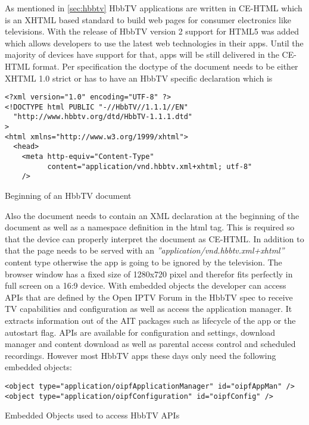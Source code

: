 As mentioned in \ref{sec:hbbtv} HbbTV applications are written in CE-HTML which is an XHTML based standard to build web pages for consumer electronics like televisions. With the release of HbbTV version 2 support for HTML5 was added which allows developers to use the latest web technologies in their apps. Until the majority of devices have support for that, apps will be still delivered in the CE-HTML format. Per specification the doctype of the document needs to be either XHTML 1.0 strict or has to have an HbbTV specific declaration which is

\vspace{1cm}
\begin{listing}[H]
\begin{verbatim}
<?xml version="1.0" encoding="UTF-8" ?>
<!DOCTYPE html PUBLIC "-//HbbTV//1.1.1//EN"
  "http://www.hbbtv.org/dtd/HbbTV-1.1.1.dtd"
>
<html xmlns="http://www.w3.org/1999/xhtml">
  <head>
    <meta http-equiv="Content-Type"
          content="application/vnd.hbbtv.xml+xhtml; utf-8"
    />
\end{verbatim}
\caption{Beginning of an HbbTV document}
\label{lst:doctype}
\end{listing}
\vspace{0.5cm}

Also the document needs to contain an XML declaration at the beginning of the document as well as a namespace definition in the html tag. This is required so that the device can properly interpret the document as CE-HTML. In addition to that the page needs to be served with an \textit{''application/vnd.hbbtv.xml+xhtml''} content type otherwise the app is going to be ignored by the television. The browser window has a fixed size of 1280x720 pixel and therefor fits perfectly in full screen on a 16:9 device. With embedded objects the developer can access APIs that are defined by the Open IPTV Forum in the HbbTV spec to receive TV capabilities and configuration as well as access the application manager. It extracts information out of the AIT packages such as lifecycle of the app or the autostart flag. APIs are available for configuration and settings, download manager and content download as well as parental access control and scheduled recordings. However most HbbTV apps these days only need the following embedded objects:

\vspace{1cm}
\begin{listing}[H]
\begin{verbatim}
<object type="application/oipfApplicationManager" id="oipfAppMan" />
<object type="application/oipfConfiguration" id="oipfConfig" />
\end{verbatim}
\caption{Embedded Objects used to access HbbTV APIs}
\label{lst:embeddedObjects}
\end{listing}
\vspace{0.5cm}

